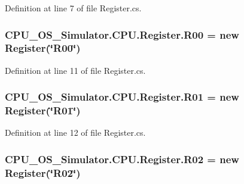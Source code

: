 Definition at line 7 of file Register.\+cs.

\hypertarget{class_c_p_u___o_s___simulator_1_1_c_p_u_1_1_register_a14dd660fd5c709aa90298e0716d8b88a}{}
\subsubsection[{R00}]{ C\+P\+U\+\_\+\+O\+S\+\_\+\+Simulator.\+C\+P\+U.\+Register.\+R00 = new {\bf Register}(\char`\"{}R00\char`\"{})\hspace{0.3cm}{\ttfamily [static]}}\label{class_c_p_u___o_s___simulator_1_1_c_p_u_1_1_register_a14dd660fd5c709aa90298e0716d8b88a}


Definition at line 11 of file Register.\+cs.

\hypertarget{class_c_p_u___o_s___simulator_1_1_c_p_u_1_1_register_a8e2da18c4d80597ebe22c0cdd23d5211}{}
\subsubsection[{R01}]{ C\+P\+U\+\_\+\+O\+S\+\_\+\+Simulator.\+C\+P\+U.\+Register.\+R01 = new {\bf Register}(\char`\"{}R01\char`\"{})\hspace{0.3cm}{\ttfamily [static]}}\label{class_c_p_u___o_s___simulator_1_1_c_p_u_1_1_register_a8e2da18c4d80597ebe22c0cdd23d5211}


Definition at line 12 of file Register.\+cs.

\hypertarget{class_c_p_u___o_s___simulator_1_1_c_p_u_1_1_register_a80b13ce612c017c483a1a4edfecd6d99}{}
\subsubsection[{R02}]{ C\+P\+U\+\_\+\+O\+S\+\_\+\+Simulator.\+C\+P\+U.\+Register.\+R02 = new {\bf Register}(\char`\"{}R02\char`\"{})\hspace{0.3cm}{\ttfamily [static]}}\label{class_c_p_u___o_s___simulator_1_1_c_p_u_1_1_register_a80b13ce612c017c483a1a4edfecd6d99}


